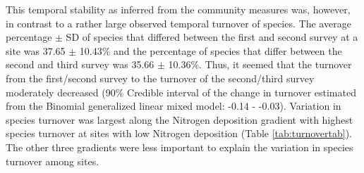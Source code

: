 \documentclass[fleqn,10pt,lineno]{wlpeerj} %
\theoremstyle{definition}
\theoremstyle{definition}
\theoremstyle{definition}
\theoremstyle{remark}
\begin{document}
This temporal stability as inferred from the community measures was,
however, in contrast to a rather large observed temporal turnover of
species. The average percentage \(\pm\) SD of species that differed
between the first and second survey at a site was 37.65 \(\pm\) 10.43\%
and the percentage of species that differ between the second and third
survey was 35.66 \(\pm\) 10.36\%. Thus, it seemed that the turnover from
the first/second survey to the turnover of the second/third survey
moderately decreased (90\% Credible interval of the change in turnover
estimated from the Binomial generalized linear mixed model: -0.14 -
-0.03). Variation in species turnover was largest along the Nitrogen
deposition gradient with highest species turnover at sites with low
Nitrogen deposition (Table \ref{tab:turnovertab}). The other three
gradients were less important to explain the variation in species
turnover among sites.
\end{document}
